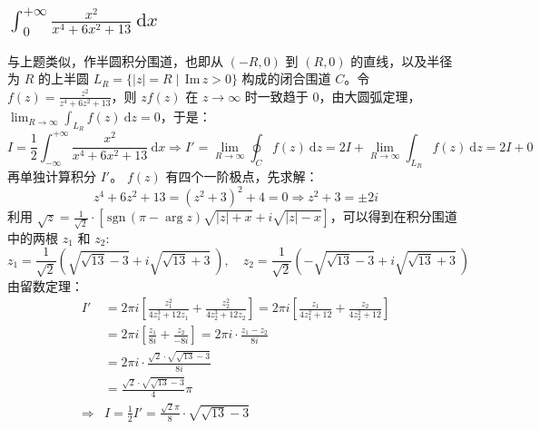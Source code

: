 \documentclass[UTF8]{report}
\def\Im{\mathrm{\,Im\,}}
\def\sgn{\mathrm{\,sgn\,}}
\theoremstyle{MyLineTheoremStyle} %
\theoremstyle{MyBlockTheoremStyle} %
\theoremstyle{MySubsubsectionStyle} %
\begin{document}
\subsection{$\displaystyle \int_{0}^{+\infty}  \frac{x^2}{x^4 + 6x^2 + 13}  \ \mathrm{d}x$}
与上题类似，作半圆积分围道，也即从 $(-R, 0)$ 到 $(R, 0)$ 的直线，以及半径为 $R$ 的上半圆 $L_R = \{| z | = R \mid \Im z > 0\}$ 构成的闭合围道 $C$。令 $f(z) = \frac{z^2}{z^4 + 6z^2 + 13}$，则 $zf(z)$ 在 $z \to \infty$ 时一致趋于 0，由大圆弧定理，$\lim_{R \to \infty}\int_{L_R} f(z) \ \mathrm{d}z = 0$，于是：
\begin{equation}
    I = \frac{1}{2} \int_{-\infty}^{+\infty}  \frac{x^2}{x^4 + 6x^2 + 13}  \ \mathrm{d}x
    \Longrightarrow 
    I' = \lim_{R \to \infty}\oint_{C} f(z) \ \mathrm{d}z = 
    2 I + \lim_{R \to \infty}\int_{L_R} f(z) \ \mathrm{d}z
    = 2I + 0
\end{equation}
再单独计算积分 $I'$。
$f(z)$ 有四个一阶极点，先求解：
\begin{equation}
    z^4 + 6z^2 + 13 = \left(z^2 + 3\right)^2 + 4 = 0 \Longrightarrow z^2 + 3 = \pm 2 i
\end{equation}
利用 $\sqrt{z} = \frac{1}{\sqrt{2}}\cdot \left[ \sgn (\pi - \arg z) \sqrt{| z | + x} + i \sqrt{| z | - x} \right]$，可以得到在积分围道中的两根 $z_1$ 和 $z_2$:
\begin{equation}
    z_1 = \frac{1}{\sqrt{2}} \left( \sqrt{\sqrt{13} - 3} + i \sqrt{\sqrt{13} + 3}^{\ } \right),\quad z_2 = \frac{1}{\sqrt{2}} \left( -\sqrt{\sqrt{13} - 3} + i \sqrt{\sqrt{13} + 3}^{\ } \right)
\end{equation}
由留数定理：
\begin{align}
I' 
&= 2\pi i \left[ \frac{z_1^2}{4z_1^3 + 12z_1} + \frac{z_2^2}{4z_2^3 + 12z_2} \right] 
= 2\pi i \left[ \frac{z_1}{4z_1^2 + 12} + \frac{z_2}{4z_2^2 + 12}\right] \\ 
&= 2\pi i \left[ \frac{z_1}{8i} + \frac{z_2}{-8i} \right]
= 2\pi i \cdot \frac{z_1 - z_2}{8i} \\
&= 2\pi i \cdot \frac{\sqrt{2} \cdot \sqrt{\sqrt{13} - 3}}{8i} \\
&= \frac{\sqrt{2}\cdot\sqrt{\sqrt{13} - 3}}{4}\pi \\
\Longrightarrow & \boxed{I = \frac{1}{2}I' = \frac{\sqrt{2}\pi}{8} \cdot \sqrt{\sqrt{13} - 3}} 
\end{align}
\end{document}
